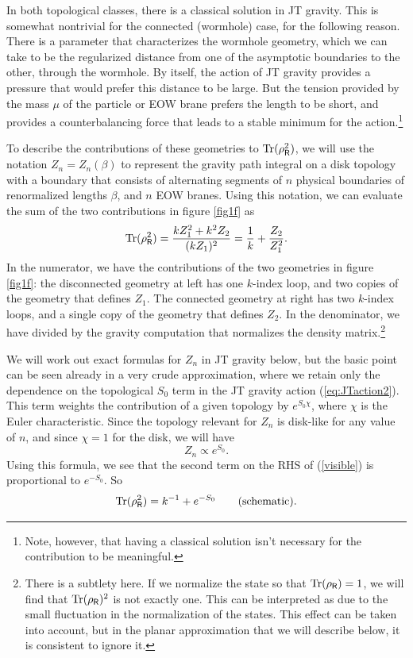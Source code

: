 \documentclass[11pt]{article}
\newcommand{\be}{\begin{equation}}
\newcommand{\ee}{\end{equation}}
\numberwithin{equation}{section}
\def\tr{\text{Tr}}
\begin{document}
In both topological classes, there is a classical solution in JT gravity. This is somewhat nontrivial for the connected (wormhole) case, for the following reason. There is a parameter that characterizes the wormhole geometry, which we can take to be the regularized distance from one of the asymptotic boundaries to the other, through the wormhole. By itself, the action of JT gravity provides a pressure that would prefer this distance to be large. But the tension provided by the mass $\mu$ of the particle or EOW brane prefers the length to be short, and provides a counterbalancing force that leads to a stable minimum for the action.\footnote{Note, however, that having a classical solution isn't necessary for the contribution to be meaningful.}

To describe the contributions of these geometries to $\tr(\rho_{\sf{R}}^2)$, we will use the notation $Z_n = Z_n(\beta)$ to represent the gravity path integral on a disk topology with a boundary that consists of alternating segments of $n$ physical boundaries of renormalized lengths $\beta$, and $n$ EOW branes. Using this notation, we can evaluate the sum of the two contributions in figure \ref{fig1f} as
\be
\tr(\rho_{\sf{R}}^2) =  \frac{kZ_1^2 + k^2Z_2}{(k Z_1)^2} = \frac{1}{k} + \frac{Z_2}{Z_1^2}.\label{visible}
\ee
In the numerator, we have the contributions of the two geometries in figure \ref{fig1f}: the disconnected geometry at left has one $k$-index loop, and two copies of the geometry that defines $Z_1$. The connected geometry at right has two $k$-index loops, and a single copy of the geometry that defines $Z_2$. In the denominator, we have divided by the gravity computation that normalizes the density matrix.\footnote{There is a subtlety here. If we normalize the state so that $\tr(\rho_{\sf{R}}) = 1$, we will find that $\tr(\rho_{\sf{R}})^2$ is not exactly one. This can be interpreted as due to the small fluctuation in the normalization of the states. This effect can be taken into account, but in the planar approximation that we will describe below, it is consistent to ignore it.}

We will work out exact formulas for $Z_n$ in JT gravity below, but the basic point can be seen already in a very crude approximation, where we retain only the dependence on the topological $S_0$ term in the JT gravity action (\ref{eq:JTaction2}). This term weights the contribution of a given topology by $e^{S_0\chi}$, where $\chi$ is the Euler characteristic. Since the topology relevant for $Z_n$ is disk-like for any value of $n$, and since $\chi = 1$ for the disk, we will have
\be
Z_n \propto e^{S_0}.\label{s0}
\ee
Using this formula, we see that the second term on the RHS of (\ref{visible}) is proportional to $e^{-S_0}$. So
\be
\tr(\rho_{\sf{R}}^2) = k^{-1} + e^{-S_0} \hspace{20pt} \text{(schematic)}.
\ee
\end{document}
